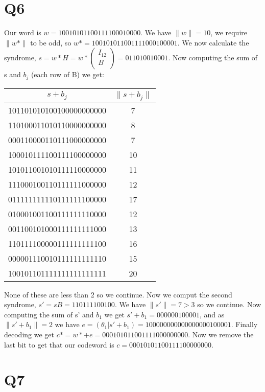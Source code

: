\documentclass{article}
\begin{document}
\section*{Q6}
Our word is $w=10010101100111100010000$. We have $\lVert w \rVert=10$, we require $\lVert w*\rVert$ to be odd, so $w*=100101011001111000100001$. We now calculate the syndrome, $s=w*H=w*\begin{pmatrix}I_{12}\\B\\\end{pmatrix}=011010010001$. Now computing the sum of s and $b_j$ (each row of B) we get:

\begin{center}
\begin{tabular}{||c c||}
 \hline
 $s+b_j$&$\lVert s+b_j\rVert$\\ [0.5ex] 
 \hline
 101101010100100000000000 & 7 \\
 \hline
 110100011010110000000000 & 8\\ 
 \hline
 000110000110111000000000 & 7 \\
 \hline
 100010111100111100000000 & 10 \\
 \hline
 101011001010111110000000 & 11\\
 \hline
 111000100110111111000000 & 12 \\
 \hline
 011111111110111111100000 & 17\\
 \hline
 010001001100111111110000 & 12\\
 \hline
 001100101000111111111000 & 13\\
 \hline
 110111100000111111111100 & 16\\
 \hline
 000001110010111111111110 & 15\\
 \hline
 100101101111111111111111 & 20\\[1ex] 
 \hline 
\end{tabular}
\end{center}
None of these are less than 2 so we continue. Now we comput the second syndrome, $s'=sB=110111100100$. We have $\lVert s'\rVert=7>3$ so we continue. Now computing the sum of s' and $b_1$ we get $s'+b_1=000000100001$, and as $\lVert s'+b_1\rVert=2$ we have $e=(\theta_1|s'+b_1)=100000000000000000100001$. Finally decoding we get $c*=w*+e=000101011001111000000000$. Now we remove the last bit to get that our codeword is $c=00010101100111100000000$.
\section*{Q7}
\end{document}
